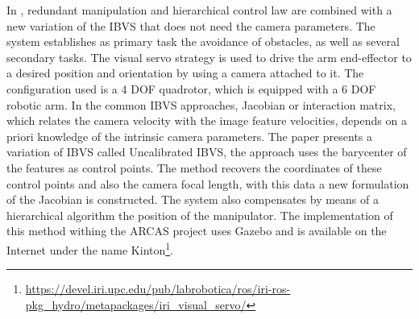 
In \cite{santamaria-navarro_uncalibrated_2017}, redundant manipulation and hierarchical control law are combined with a new variation of the IBVS that does not need the camera parameters. The system establishes as primary task the avoidance of obstacles, as well as several secondary tasks. The visual servo strategy is used to drive the arm end-effector to a desired position and orientation by using a camera attached to it. The configuration used is a 4 DOF quadrotor, which is equipped with a 6 DOF robotic arm. In the common IBVS approaches, Jacobian or interaction matrix, which relates the camera velocity with the image feature velocities, depends on a priori knowledge of the intrinsic camera parameters. The paper presents a variation of IBVS called Uncalibrated IBVS, the approach uses the barycenter of the features as control points. The method recovers the coordinates of these control points and also the camera focal length, with this data a new formulation of the Jacobian is constructed. The system also compensates by means of a hierarchical algorithm the position of the manipulator. The implementation of this method withing the ARCAS project uses Gazebo and is available on the Internet under the name Kinton\footnote{\url{https://devel.iri.upc.edu/pub/labrobotica/ros/iri-ros-pkg_hydro/metapackages/iri_visual_servo/}}.

\renewcommand{\tabularxcolumn}[1]{>{\scriptsize}m{#1}}

